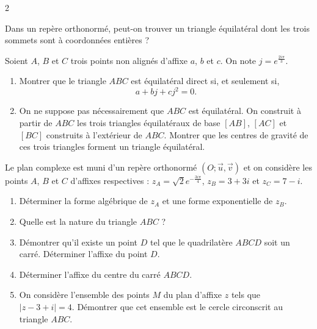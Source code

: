 \documentclass[a4paper,12pt]{article}
\begin{document}
\begin{multicols}{2}
\begin{exercice}[title={Exercice 17 \quad$\star\star\star$\quad\ {[}Représenter, Calculer, Chercher{]}}]
Dans un repère orthonormé, peut-on trouver un triangle équilatéral dont les trois sommets sont à coordonnées entières ?
\end{exercice}

\begin{exercice}[title={Exercice 18 \quad$\star\star\star$\quad\ {[}Représenter, Calculer, Raisonner{]}}]{}{}
Soient \( A \), \( B \) et \( C \) trois points non alignés d’affixe \( a \), \( b \) et \( c \). On note \( j = e^{\frac{2i\pi}{3}} \).
\begin{enumerate}
    \item Montrer que le triangle \( ABC \) est équilatéral direct si, et seulement si,
    \[
    a + bj + cj^2 = 0.
    \]
    \item On ne suppose pas nécessairement que \( ABC \) est équilatéral. On construit à partir de \( ABC \) les trois triangles équilatéraux de base \([AB]\), \([AC]\) et \([BC]\) construits à l’extérieur de \( ABC \). Montrer que les centres de gravité de ces trois triangles forment un triangle équilatéral.
\end{enumerate}
\end{exercice}

\begin{exercice}[title=Exercice 19 \quad$\star\star$\quad\ ]{}{}
Le plan complexe est muni d'un repère orthonormé \( (O ; \vec{u}, \vec{v}) \) et on considère les points \( A \), \( B \) et \( C \) d'affixes respectives :  
\( z_A = \sqrt{2}e^{-\frac{3i\pi}{4}} \), \( z_B = 3 + 3i \) et \( z_C = 7 - i \).

\begin{enumerate}
    \item Déterminer la forme algébrique de \( z_A \) et une forme exponentielle de \( z_B \).
    \item Quelle est la nature du triangle \( ABC \) ?
    \item Démontrer qu'il existe un point \( D \) tel que le quadrilatère \( ABCD \) soit un carré. Déterminer l'affixe du point \( D \).
    \item Déterminer l'affixe du centre du carré \( ABCD \).
    \item On considère l'ensemble des points \( M \) du plan d'affixe \( z \) tels que \( |z - 3 + i| = 4 \). Démontrer que cet ensemble est le cercle circonscrit au triangle \( ABC \).
\end{enumerate}
\end{exercice}



\end{multicols}
\end{document}
